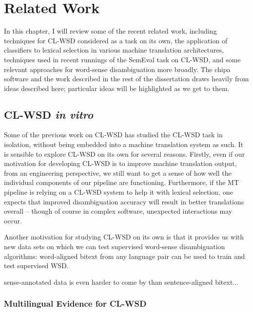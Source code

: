 \chapter{Related Work}
\label{chap:relatedwork}

In this chapter, I will review some of the recent related work, including
techniques for CL-WSD considered as a task on its own, the application of
classifiers to lexical selection in various machine translation architectures,
techniques used in recent runnings of the SemEval task on CL-WSD, and some
relevant approaches for word-sense disambiguation more broadly. The chipa
software and the work described in the rest of the dissertation draws heavily
from ideas described here; particular ideas will be highlighted as we get to
them.


\section{CL-WSD \emph{in vitro}}

Some of the previous work on CL-WSD has studied the CL-WSD task in isolation, 
without being embedded into a machine translation system as such.
It is sensible to explore CL-WSD on its own for several reasons. Firstly, even
if our motivation for developing CL-WSD is to improve machine translation
output, from an engineering perspective, we still want to get a sense of
how well the individual components of our pipeline are functioning.
Furthermore, if the MT pipeline is relying on a CL-WSD system to help it with
lexical selection, one expects that improved disambiguation accuracy will
result in better translations overall -- though of course in complex software,
unexpected interactions may occur.

Another motivation for studying CL-WSD on its own is that it provides us with
new data sets on which we can test supervised word-sense disambiguation
algorithms: word-aligned bitext from any language pair can be used to train and
test supervised WSD.

sense-annotated data is even harder to come by than sentence-aligned bitext...


\subsection{Multilingual Evidence for CL-WSD}

